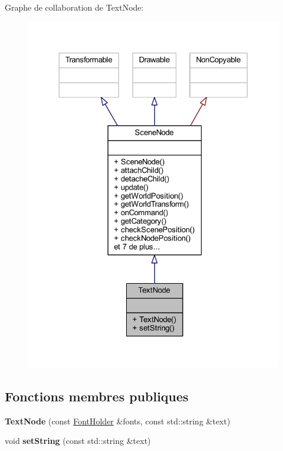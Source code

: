 Graphe de collaboration de Text\+Node\+:\nopagebreak
\begin{figure}[H]
\begin{center}
\leavevmode
\includegraphics[width=324pt]{class_text_node__coll__graph}
\end{center}
\end{figure}
\subsection*{Fonctions membres publiques}
\begin{DoxyCompactItemize}
\item 
\hypertarget{class_text_node_a6ac9f0e37c705f4afdeb2c1888ca4084}{}\label{class_text_node_a6ac9f0e37c705f4afdeb2c1888ca4084} 
{\bfseries Text\+Node} (const \hyperlink{class_resource_holder}{Font\+Holder} \&fonts, const std\+::string \&text)
\item 
\hypertarget{class_text_node_a51c396c803287f43ee640c6b6421a212}{}\label{class_text_node_a51c396c803287f43ee640c6b6421a212} 
void {\bfseries set\+String} (const std\+::string \&text)
\end{DoxyCompactItemize}
